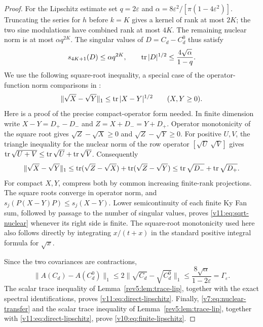 \begin{proof}
For the Lipschitz estimate set $q=2\varepsilon$ and
$\alpha=8\varepsilon^2/[\pi(1-4\varepsilon^2)]$.
Truncating the series for $h$ before $k=K$ gives a kernel of rank at most
$2K$; the two sine modulations have combined rank at most $4K$.
The remaining nuclear norm is at most $\alpha q^{2K}$.
The singular values of $D=C_d-C_d^0$ thus satisfy
\[
 s_{4K+1}(D)\le\alpha q^{2K},\qquad
 \operatorname{tr}|D|^{1/2}\le\frac{4\sqrt\alpha}{1-q}.
\]
We use the following square-root inequality, a special case of the
operator-function norm comparisons in \cite{Ando1988}:
\begin{equation}\label{v11:eq:sqrt-nuclear}
 \|\sqrt{X}-\sqrt{Y}\|_1\le\operatorname{tr}|X-Y|^{1/2}\qquad(X,Y\ge0).
\end{equation}
Here is a proof of the precise compact-operator form needed.  In finite
dimension write $X-Y=D_+-D_-$ and $Z=X+D_-=Y+D_+$.
Operator monotonicity of the square root gives
$\sqrt Z-\sqrt X\ge0$ and $\sqrt Z-\sqrt Y\ge0$.
For positive $U,V$, the triangle inequality for the nuclear norm of
the row operator $[\sqrt U\ \sqrt V]$ gives
$\operatorname{tr}\sqrt{U+V}\le\operatorname{tr}\sqrt U+\operatorname{tr}\sqrt V$.
Consequently
\[
 \|\sqrt X-\sqrt Y\|_1
 \le\operatorname{tr}(\sqrt Z-\sqrt X)+\operatorname{tr}(\sqrt Z-\sqrt Y)
 \le\operatorname{tr}\sqrt{D_-}+\operatorname{tr}\sqrt{D_+}.
\]
For compact $X,Y$, compress both by common increasing finite-rank
projections.  The square roots converge in operator norm, and
$s_j(P(X-Y)P)\le s_j(X-Y)$.  Lower semicontinuity of each finite
Ky Fan sum, followed by passage to the number of singular values,
proves \eqref{v11:eq:sqrt-nuclear} whenever its right side is finite.
The square-root monotonicity used here also follows directly by
integrating $x/(t+x)$ in the standard positive integral formula for
$\sqrt{x}$.

Since the two covariances are contractions,
\[
 \|A(C_d)-A(C_d^0)\|_1
 \le2\|\sqrt{C_d}-\sqrt{C_d^0}\|_1
 \le\frac{8\sqrt\alpha}{1-2\varepsilon}=\Gamma_\varepsilon.
\]
The scalar trace inequality of Lemma~\ref{rev5:lem:trace-lip},
together with the exact spectral identifications, proves
\eqref{v11:eq:direct-lipschitz}.
Finally, \eqref{v7:eq:nuclear-transfer} and the scalar trace inequality
of Lemma~\ref{rev5:lem:trace-lip}, together with
\eqref{v11:eq:direct-lipschitz}, prove
\eqref{v10:eq:finite-lipschitz}.
\end{proof}


